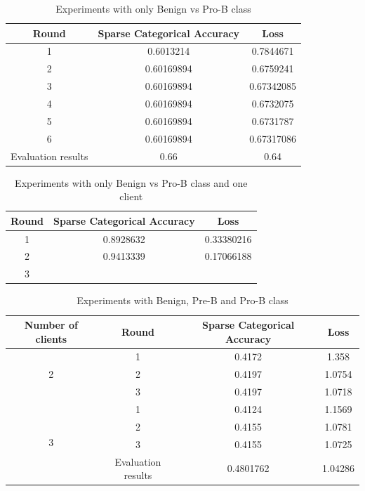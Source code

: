 \documentclass[runningheads,a4paper,11pt]{report}
\begin{document}
\begin{table}[htb!]
\centering
\begin{tabular}{|c|c|c|}
\hline
\textbf{Round} & \textbf{Sparse Categorical Accuracy} & \textbf{Loss} \\
\hline
1 & 0.6013214 & 0.7844671 \\
\hline
2 & 0.60169894 & 0.6759241 \\
\hline
3 & 0.60169894 & 0.67342085 \\
\hline
4 & 0.60169894 & 0.6732075 \\
\hline
5 & 0.60169894 & 0.6731787 \\
\hline
6 & 0.60169894 & 0.67317086 \\
\hline
Evaluation results & 0.66 & 0.64 \\
\hline
\end{tabular}

\caption{Experiments with only Benign vs Pro-B class}
\label{tab:results_adam_experiment_2}
\end{table} 

\begin{table}[htb!]
\centering
\begin{tabular}{|c|c|c|}
\hline
\textbf{Round} & \textbf{Sparse Categorical Accuracy} & \textbf{Loss} \\
\hline
1 & 0.8928632 & 0.33380216 \\
\hline
2 & 0.9413339 & 0.17066188 \\
\hline
3 & \approx 0.95 & \approx 0.16 \\
\hline
\end{tabular}

\caption{Experiments with only Benign vs Pro-B class and one client}
\label{tab:results_adam_experiment_4}
\end{table} 

\begin{table}[htb!]
\centering
\begin{tabular}{|c|c|c|c|}
\hline
\textbf{Number of clients} & \textbf{Round} & \textbf{Sparse Categorical Accuracy} & \textbf{Loss} \\
\hline
\multirow{3}{1em}{2} & 1  & 0.4172 & 1.358 \\
 & 2 & 0.4197 & 1.0754 \\
 &  3 & 0.4197 & 1.0718 \\
\hline
\multirow{4}{1em}{3} & 1  & 0.4124 & 1.1569 \\
 & 2 & 0.4155 & 1.0781 \\
 &  3 & 0.4155 & 1.0725 \\
& Evaluation results & 0.4801762 &  1.04286\\
\hline
\end{tabular}
\caption{Experiments with Benign, Pre-B and Pro-B class}
\label{tab:results_adam_experiment_3}
\end{table}
\end{document}

